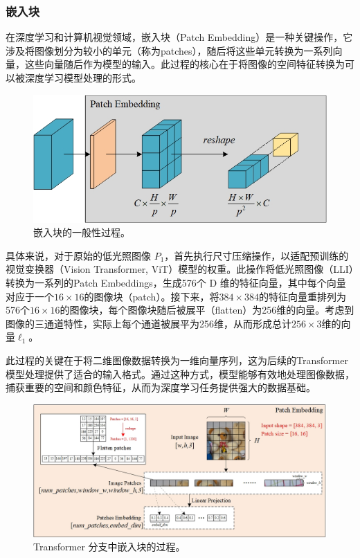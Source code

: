 \documentclass[a4paper]{ctexart}
\begin{document}
\subsubsection{嵌入块}
	
在深度学习和计算机视觉领域，嵌入块（Patch Embedding）是一种关键操作，它涉及将图像划分为较小的单元（称为patches），随后将这些单元转换为一系列向量，这些向量随后作为模型的输入。此过程的核心在于将图像的空间特征转换为可以被深度学习模型处理的形式。
	
\begin{figure}[htb]
	\centering 
	\includegraphics[width=0.5\columnwidth]{picture/LLIE/My Architecture/Patch Embedding}
	\caption{
		\label{fig: Patch Embedding} 
		嵌入块的一般性过程。
	}
\end{figure}
	
具体来说，对于原始的低光照图像 $P_1$，首先执行尺寸压缩操作，以适配预训练的视觉变换器（Vision Transformer, ViT）模型的权重。此操作将低光照图像（LLI）转换为一系列的Patch Embeddings，生成576个 D 维的特征向量，其中每个向量对应于一个$16 \times 16$的图像块（patch）。接下来，将$384 \times 384$的特征向量重排列为576个$16\times16$的图像块，每个图像块随后被展平（flatten）为256维的向量。考虑到图像的三通道特性，实际上每个通道被展平为256维，从而形成总计$256 \times 3$维的向量$\ell_1$。

此过程的关键在于将二维图像数据转换为一维向量序列，这为后续的Transformer模型处理提供了适合的输入格式。通过这种方式，模型能够有效地处理图像数据，捕获重要的空间和颜色特征，从而为深度学习任务提供强大的数据基础。
	
\begin{figure}[htb]
	\centering 
	\includegraphics[width=0.8\columnwidth]{picture/LLIE/My Architecture/Patch Embedding(ViT)}
	\caption{
		\label{fig: Patch Embedding(ViT)} 
		Transformer 分支中嵌入块的过程。
	}
\end{figure}
	
\end{document}
